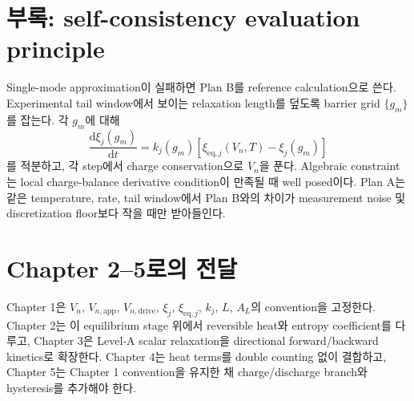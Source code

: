 \documentclass[11pt,a4paper]{article}
\newcommand{\dd}{\mathrm{d}}
\newcommand{\eq}{\mathrm{eq}}
\newcommand{\app}{\mathrm{app}}
\newcommand{\drive}{\mathrm{drive}}
\begin{document}
\section{부록: self-consistency evaluation principle}\label{sec:ch1_numeric}
Single-mode approximation이 실패하면 Plan B를 reference calculation으로 쓴다. Experimental tail window에서 보이는 relaxation length를
덮도록 barrier grid $\{g_m\}$를 잡는다. 각 $g_m$에 대해
\begin{equation}
\frac{\dd\xi_j(g_m)}{\dd t}=k_j(g_m)[\xi_{\eq,j}(V_n,T)-\xi_j(g_m)]
\end{equation}
를 적분하고, 각 step에서 charge conservation으로 $V_n$을 푼다. Algebraic constraint는 local charge-balance derivative condition이
만족될 때 well posed이다. Plan A는 같은 temperature, rate, tail window에서 Plan B와의 차이가 measurement noise 및 discretization floor보다
작을 때만 받아들인다.

\section*{Chapter 2--5로의 전달}
Chapter 1은 $V_n$, $V_{n,\app}$, $V_{n,\drive}$, $\xi_j$, $\xi_{\eq,j}$, $k_j$, $L$, $A_L$의 convention을 고정한다.
Chapter 2는 이 equilibrium stage 위에서 reversible heat와 entropy coefficient를 다루고, Chapter 3은 Level-A scalar relaxation을
directional forward/backward kinetics로 확장한다. Chapter 4는 heat terms를 double counting 없이 결합하고, Chapter 5는 Chapter 1
convention을 유지한 채 charge/discharge branch와 hysteresis를 추가해야 한다.
\end{document}
